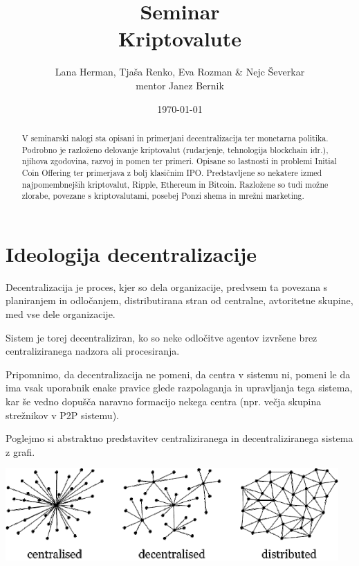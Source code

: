 \documentclass[letterpaper, titlepage, freqn]{article}
\begin{document}
\title{Seminar \\ Kriptovalute}
\author{Lana Herman, Tjaša Renko, Eva Rozman \& Nejc Ševerkar \\ mentor Janez Bernik}
\date{\today}
\maketitle

\begin{abstract}
\begin{center}
V seminarski nalogi sta opisani in primerjani decentralizacija ter monetarna politika. Podrobno je razloženo delovanje kriptovalut (rudarjenje, tehnologija blockchain idr.), njihova zgodovina, razvoj in pomen ter primeri. Opisane so lastnosti in problemi Initial Coin Offering ter primerjava z bolj klasičnim IPO. Predstavljene so nekatere izmed najpomembnejših kriptovalut, Ripple, Ethereum in Bitcoin. Razložene so tudi možne zlorabe, povezane s kriptovalutami, posebej Ponzi shema in mrežni marketing.
\end{center}
\end{abstract}

\tableofcontents


\clearpage

\section{Ideologija decentralizacije}

Decentralizacija je proces, kjer so dela organizacije, predvsem ta povezana s planiranjem in odločanjem, distributirana stran od centralne, avtoritetne skupine, med vse dele organizacije.

Sistem je torej decentraliziran, ko so neke odločitve agentov izvršene brez centraliziranega nadzora ali procesiranja.

Pripomnimo, da decentralizacija ne pomeni, da centra v sistemu ni, pomeni le da ima vsak uporabnik enake pravice glede razpolaganja in upravljanja tega sistema, kar še vedno dopušča naravno formacijo nekega centra (npr. večja skupina strežnikov v P2P sistemu).

Poglejmo si abstraktno predstavitev centraliziranega in decentraliziranega sistema z grafi.\\

\begin{center}
\includegraphics[height=3.5cm]{ponazoritev_decentralizacije}
\end{center}
\end{document}
